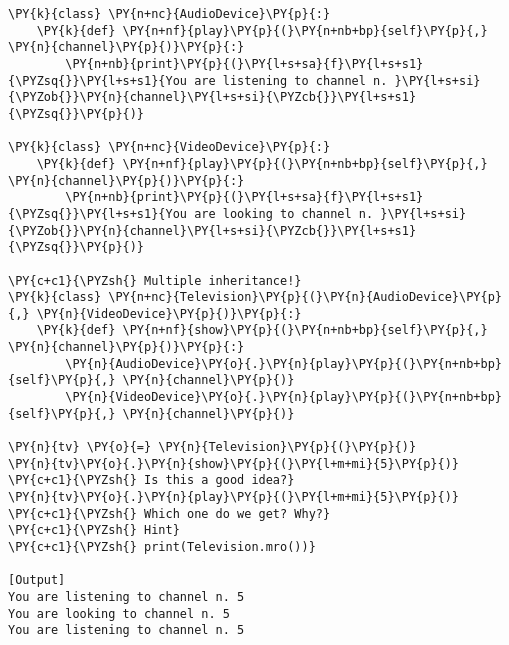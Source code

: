\begin{Verbatim}[label=\makebox{\url{https://github.com/lucabaldini/cmepda/tree/master/slides/latex/snippets/multiple\_inheritance.py}},commandchars=\\\{\}]
\PY{k}{class} \PY{n+nc}{AudioDevice}\PY{p}{:}
    \PY{k}{def} \PY{n+nf}{play}\PY{p}{(}\PY{n+nb+bp}{self}\PY{p}{,} \PY{n}{channel}\PY{p}{)}\PY{p}{:}
        \PY{n+nb}{print}\PY{p}{(}\PY{l+s+sa}{f}\PY{l+s+s1}{\PYZsq{}}\PY{l+s+s1}{You are listening to channel n. }\PY{l+s+si}{\PYZob{}}\PY{n}{channel}\PY{l+s+si}{\PYZcb{}}\PY{l+s+s1}{\PYZsq{}}\PY{p}{)}

\PY{k}{class} \PY{n+nc}{VideoDevice}\PY{p}{:}
    \PY{k}{def} \PY{n+nf}{play}\PY{p}{(}\PY{n+nb+bp}{self}\PY{p}{,} \PY{n}{channel}\PY{p}{)}\PY{p}{:}
        \PY{n+nb}{print}\PY{p}{(}\PY{l+s+sa}{f}\PY{l+s+s1}{\PYZsq{}}\PY{l+s+s1}{You are looking to channel n. }\PY{l+s+si}{\PYZob{}}\PY{n}{channel}\PY{l+s+si}{\PYZcb{}}\PY{l+s+s1}{\PYZsq{}}\PY{p}{)}

\PY{c+c1}{\PYZsh{} Multiple inheritance!}
\PY{k}{class} \PY{n+nc}{Television}\PY{p}{(}\PY{n}{AudioDevice}\PY{p}{,} \PY{n}{VideoDevice}\PY{p}{)}\PY{p}{:}
    \PY{k}{def} \PY{n+nf}{show}\PY{p}{(}\PY{n+nb+bp}{self}\PY{p}{,} \PY{n}{channel}\PY{p}{)}\PY{p}{:}
        \PY{n}{AudioDevice}\PY{o}{.}\PY{n}{play}\PY{p}{(}\PY{n+nb+bp}{self}\PY{p}{,} \PY{n}{channel}\PY{p}{)}
        \PY{n}{VideoDevice}\PY{o}{.}\PY{n}{play}\PY{p}{(}\PY{n+nb+bp}{self}\PY{p}{,} \PY{n}{channel}\PY{p}{)}

\PY{n}{tv} \PY{o}{=} \PY{n}{Television}\PY{p}{(}\PY{p}{)}
\PY{n}{tv}\PY{o}{.}\PY{n}{show}\PY{p}{(}\PY{l+m+mi}{5}\PY{p}{)}
\PY{c+c1}{\PYZsh{} Is this a good idea?}
\PY{n}{tv}\PY{o}{.}\PY{n}{play}\PY{p}{(}\PY{l+m+mi}{5}\PY{p}{)} \PY{c+c1}{\PYZsh{} Which one do we get? Why?}
\PY{c+c1}{\PYZsh{} Hint}
\PY{c+c1}{\PYZsh{} print(Television.mro())}

[Output]
You are listening to channel n. 5
You are looking to channel n. 5
You are listening to channel n. 5
\end{Verbatim}